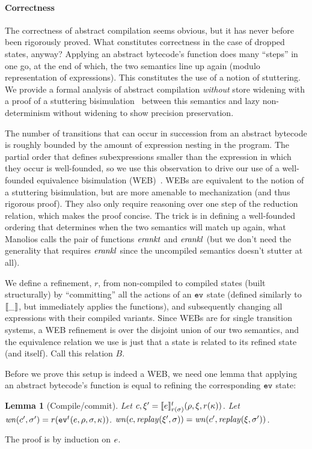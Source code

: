 \documentclass[preprint,onecolumn,9pt]{sigplanconf} %
\newtheorem{lemma}{Lemma}
\begin{document}
\paragraph{Correctness}
The correctness of abstract compilation seems obvious, but it has
never before been rigorously proved. What constitutes correctness in
the case of dropped states, anyway? Applying an abstract bytecode's
function does many ``steps'' in one go, at the end of which, the two
semantics line up again (modulo representation of expressions). This
constitutes the use of a notion of stuttering. We provide a formal
analysis of abstract compilation \emph{without} store widening with a proof
of a stuttering bisimulation~\cite{ianjohnson:BCG88} between this
semantics and lazy non-determinism without widening to show precision
preservation. %

The number of transitions that can occur in succession from an
abstract bytecode is roughly bounded by the amount of expression
nesting in the program. The partial order that defines subexpressions
smaller than the expression in which they occur is well-founded, so we
use this observation to drive our use of a well-founded equivalence
bisimulation (WEB)~\cite{ianjohnson:manolios-diss}. WEBs are
equivalent to the notion of a stuttering bisimulation, but are more
amenable to mechanization (and thus rigorous proof). They also only
require reasoning over one step of the reduction relation, which makes
the proof concise. The trick is in defining a well-founded ordering
that determines when the two semantics will match up again, what
Manolios calls the pair of functions $\erankt$ and $\erankl$ (but we
don't need the generality that requires $\erankl$ since the uncompiled
semantics doesn't stutter at all).

We define a refinement, $r$, from non-compiled to compiled states (built structurally) by
``committing'' all the actions of an $\evalone$ state (defined similarly to
$\compile{\_}$, but immediately applies the functions), and
subsequently changing all expressions with their compiled
variants. Since WEBs are for single transition systems, a WEB
refinement is over the disjoint union of our two semantics, and the
equivalence relation we use is just that a state is related to its
refined state (and itself). Call this relation $B$.

Before we prove this setup is indeed a WEB, we need one lemma that
applying an abstract bytecode's function is equal to refining the
corresponding $\evalone$ state:
%
\begin{lemma}[Compile/commit]
Let $c,\msdiff' = \compile{\mexp}^\mcntr_{r(\msto)}(\menv,\msdiff,r(\mkont))$.
Let $\wn(c',\msto') = r(\ev[^\mcntr]{\mexp,\menv,\msto,\mkont})$.
$\wn(c,\replay(\msdiff',\msto)) = \wn(c',\replay(\msdiff,\msto'))$.
\end{lemma}
The proof is by induction on $\mexp$.
\end{document}
